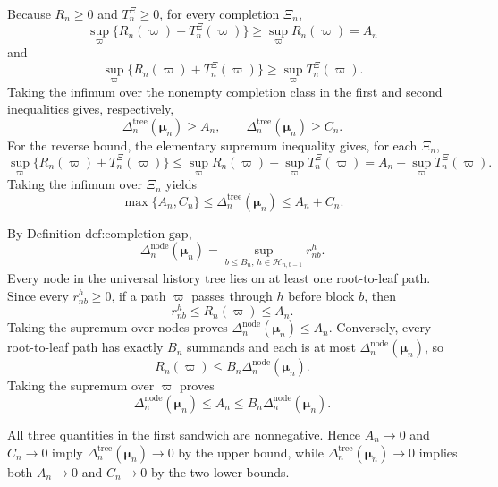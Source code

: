 Because \(R_n\ge0\) and \(T_n^{\Xi}\ge0\), for every completion \(\Xi_n\),
\[
\sup_{\varpi}\{R_n(\varpi)+T_n^{\Xi}(\varpi)\}
\ge \sup_{\varpi}R_n(\varpi)=A_n
\]
and
\[
\sup_{\varpi}\{R_n(\varpi)+T_n^{\Xi}(\varpi)\}
\ge \sup_{\varpi}T_n^{\Xi}(\varpi).
\]
Taking the infimum over the nonempty completion class in the first and second inequalities gives, respectively,
\[
\Delta_n^{\mathrm{tree}}(\boldsymbol\mu_n)\ge A_n,
\qquad
\Delta_n^{\mathrm{tree}}(\boldsymbol\mu_n)\ge C_n.
\]
For the reverse bound, the elementary supremum inequality gives, for each \(\Xi_n\),
\[
\sup_{\varpi}\{R_n(\varpi)+T_n^{\Xi}(\varpi)\}
\le \sup_{\varpi}R_n(\varpi)+\sup_{\varpi}T_n^{\Xi}(\varpi)
=A_n+\sup_{\varpi}T_n^{\Xi}(\varpi).
\]
Taking the infimum over \(\Xi_n\) yields
\[
\max\{A_n,C_n\}\le
\Delta_n^{\mathrm{tree}}(\boldsymbol\mu_n)
\le A_n+C_n.
\]

By Definition \(\text{def:completion-gap}\),
\[
\Delta_n^{\mathrm{node}}(\boldsymbol\mu_n)
=\sup_{b\le B_n,\,h\in\mathcal H_{n,b-1}}r_{nb}^{h}.
\]
Every node in the universal history tree lies on at least one root-to-leaf path.  Since every \(r_{nb}^{h}\ge0\), if a path \(\varpi\) passes through \(h\) before block \(b\), then
\[
r_{nb}^{h}\le R_n(\varpi)\le A_n.
\]
Taking the supremum over nodes proves
\(\Delta_n^{\mathrm{node}}(\boldsymbol\mu_n)\le A_n\).  Conversely, every root-to-leaf path has exactly \(B_n\) summands and each is at most \(\Delta_n^{\mathrm{node}}(\boldsymbol\mu_n)\), so
\[
R_n(\varpi)\le B_n\Delta_n^{\mathrm{node}}(\boldsymbol\mu_n).
\]
Taking the supremum over \(\varpi\) proves
\[
\Delta_n^{\mathrm{node}}(\boldsymbol\mu_n)
\le A_n\le B_n\Delta_n^{\mathrm{node}}(\boldsymbol\mu_n).
\]

All three quantities in the first sandwich are nonnegative.  Hence \(A_n\to0\) and \(C_n\to0\) imply \(\Delta_n^{\mathrm{tree}}(\boldsymbol\mu_n)\to0\) by the upper bound, while \(\Delta_n^{\mathrm{tree}}(\boldsymbol\mu_n)\to0\) implies both \(A_n\to0\) and \(C_n\to0\) by the two lower bounds.

